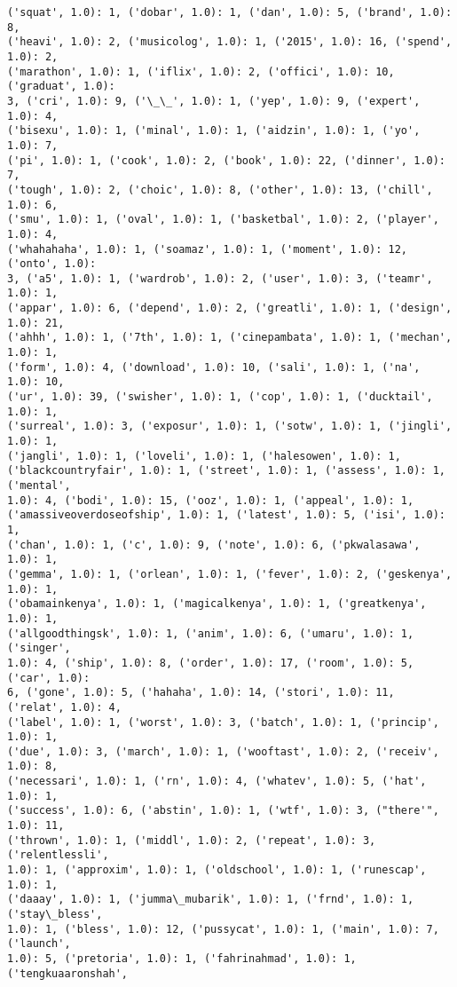\documentclass[11pt]{article}
\begin{document}
\begin{Verbatim}[commandchars=\\\{\}]
('squat', 1.0): 1, ('dobar', 1.0): 1, ('dan', 1.0): 5, ('brand', 1.0): 8,
('heavi', 1.0): 2, ('musicolog', 1.0): 1, ('2015', 1.0): 16, ('spend', 1.0): 2,
('marathon', 1.0): 1, ('iflix', 1.0): 2, ('offici', 1.0): 10, ('graduat', 1.0):
3, ('cri', 1.0): 9, ('\_\_', 1.0): 1, ('yep', 1.0): 9, ('expert', 1.0): 4,
('bisexu', 1.0): 1, ('minal', 1.0): 1, ('aidzin', 1.0): 1, ('yo', 1.0): 7,
('pi', 1.0): 1, ('cook', 1.0): 2, ('book', 1.0): 22, ('dinner', 1.0): 7,
('tough', 1.0): 2, ('choic', 1.0): 8, ('other', 1.0): 13, ('chill', 1.0): 6,
('smu', 1.0): 1, ('oval', 1.0): 1, ('basketbal', 1.0): 2, ('player', 1.0): 4,
('whahahaha', 1.0): 1, ('soamaz', 1.0): 1, ('moment', 1.0): 12, ('onto', 1.0):
3, ('a5', 1.0): 1, ('wardrob', 1.0): 2, ('user', 1.0): 3, ('teamr', 1.0): 1,
('appar', 1.0): 6, ('depend', 1.0): 2, ('greatli', 1.0): 1, ('design', 1.0): 21,
('ahhh', 1.0): 1, ('7th', 1.0): 1, ('cinepambata', 1.0): 1, ('mechan', 1.0): 1,
('form', 1.0): 4, ('download', 1.0): 10, ('sali', 1.0): 1, ('na', 1.0): 10,
('ur', 1.0): 39, ('swisher', 1.0): 1, ('cop', 1.0): 1, ('ducktail', 1.0): 1,
('surreal', 1.0): 3, ('exposur', 1.0): 1, ('sotw', 1.0): 1, ('jingli', 1.0): 1,
('jangli', 1.0): 1, ('loveli', 1.0): 1, ('halesowen', 1.0): 1,
('blackcountryfair', 1.0): 1, ('street', 1.0): 1, ('assess', 1.0): 1, ('mental',
1.0): 4, ('bodi', 1.0): 15, ('ooz', 1.0): 1, ('appeal', 1.0): 1,
('amassiveoverdoseofship', 1.0): 1, ('latest', 1.0): 5, ('isi', 1.0): 1,
('chan', 1.0): 1, ('c', 1.0): 9, ('note', 1.0): 6, ('pkwalasawa', 1.0): 1,
('gemma', 1.0): 1, ('orlean', 1.0): 1, ('fever', 1.0): 2, ('geskenya', 1.0): 1,
('obamainkenya', 1.0): 1, ('magicalkenya', 1.0): 1, ('greatkenya', 1.0): 1,
('allgoodthingsk', 1.0): 1, ('anim', 1.0): 6, ('umaru', 1.0): 1, ('singer',
1.0): 4, ('ship', 1.0): 8, ('order', 1.0): 17, ('room', 1.0): 5, ('car', 1.0):
6, ('gone', 1.0): 5, ('hahaha', 1.0): 14, ('stori', 1.0): 11, ('relat', 1.0): 4,
('label', 1.0): 1, ('worst', 1.0): 3, ('batch', 1.0): 1, ('princip', 1.0): 1,
('due', 1.0): 3, ('march', 1.0): 1, ('wooftast', 1.0): 2, ('receiv', 1.0): 8,
('necessari', 1.0): 1, ('rn', 1.0): 4, ('whatev', 1.0): 5, ('hat', 1.0): 1,
('success', 1.0): 6, ('abstin', 1.0): 1, ('wtf', 1.0): 3, ("there'", 1.0): 11,
('thrown', 1.0): 1, ('middl', 1.0): 2, ('repeat', 1.0): 3, ('relentlessli',
1.0): 1, ('approxim', 1.0): 1, ('oldschool', 1.0): 1, ('runescap', 1.0): 1,
('daaay', 1.0): 1, ('jumma\_mubarik', 1.0): 1, ('frnd', 1.0): 1, ('stay\_bless',
1.0): 1, ('bless', 1.0): 12, ('pussycat', 1.0): 1, ('main', 1.0): 7, ('launch',
1.0): 5, ('pretoria', 1.0): 1, ('fahrinahmad', 1.0): 1, ('tengkuaaronshah',

\end{Verbatim}
\end{document}
